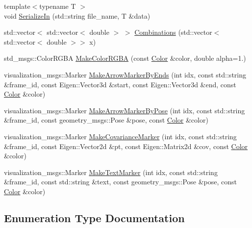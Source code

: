 \begin{DoxyCompactItemize}
\item 
{\footnotesize template$<$typename T $>$ }\\void \hyperlink{namespacecommon_aa28e88e788569055b2217ed26e48f922}{Serialize\+In} (std\+::string file\+\_\+name, T \&data)
\item 
std\+::vector$<$ std\+::vector$<$ double $>$ $>$ \hyperlink{namespacecommon_a064e9e4908dbc190a24e3b18635e3379}{Combinations} (std\+::vector$<$ std\+::vector$<$ double $>$$>$ x)
\item 
std\+\_\+msgs\+::\+Color\+R\+G\+BA \hyperlink{namespacecommon_a1536d9969a0d06faf584e616bd12ca08}{Make\+Color\+R\+G\+BA} (const \hyperlink{namespacecommon_a325f61d2a1dcd20782fbb1421c0c3631}{Color} \&color, double alpha=1.)
\item 
visualization\+\_\+msgs\+::\+Marker \hyperlink{namespacecommon_ad66202ab90483412f7aca1dbfe5d399f}{Make\+Arrow\+Marker\+By\+Ends} (int idx, const std\+::string \&frame\+\_\+id, const Eigen\+::\+Vector3d \&start, const Eigen\+::\+Vector3d \&end, const \hyperlink{namespacecommon_a325f61d2a1dcd20782fbb1421c0c3631}{Color} \&color)
\item 
visualization\+\_\+msgs\+::\+Marker \hyperlink{namespacecommon_a1e46ad350c4ff03cf926cb40667019f9}{Make\+Arrow\+Marker\+By\+Pose} (int idx, const std\+::string \&frame\+\_\+id, const geometry\+\_\+msgs\+::\+Pose \&pose, const \hyperlink{namespacecommon_a325f61d2a1dcd20782fbb1421c0c3631}{Color} \&color)
\item 
visualization\+\_\+msgs\+::\+Marker \hyperlink{namespacecommon_a61576f8134edf708a3d72a842db21413}{Make\+Covariance\+Marker} (int idx, const std\+::string \&frame\+\_\+id, const Eigen\+::\+Vector2d \&pt, const Eigen\+::\+Matrix2d \&cov, const \hyperlink{namespacecommon_a325f61d2a1dcd20782fbb1421c0c3631}{Color} \&color)
\item 
visualization\+\_\+msgs\+::\+Marker \hyperlink{namespacecommon_a8f52e7ee9db9db31ef41df1566c08b2e}{Make\+Text\+Marker} (int idx, const std\+::string \&frame\+\_\+id, const std\+::string \&text, const geometry\+\_\+msgs\+::\+Pose \&pose, const \hyperlink{namespacecommon_a325f61d2a1dcd20782fbb1421c0c3631}{Color} \&color)
\end{DoxyCompactItemize}


\subsection{Enumeration Type Documentation}
\mbox{\label{namespacecommon_a325f61d2a1dcd20782fbb1421c0c3631}} 
